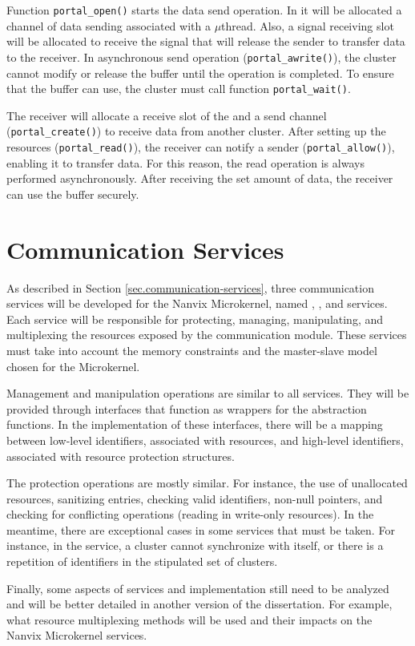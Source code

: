 		Function \texttt{portal\_open()} starts the data send operation.
		In it will be allocated a channel of data sending associated with
		a $\mu$thread.
		Also, a signal receiving slot will be allocated to receive the
		signal that will release the sender to transfer data to the receiver.
		In asynchronous send operation (\texttt{portal\_awrite()}), the cluster
		cannot modify or release the buffer until the operation is completed.
		To ensure that the buffer can use, the cluster must call function \texttt{portal\_wait()}.

		The receiver will allocate a receive slot of the \dnoc and a send
		channel (\texttt{portal\_create()}) to receive data from another cluster.
		After setting up the resources (\texttt{portal\_read()}), the receiver
		can notify a sender (\texttt{portal\_allow()}), enabling it to transfer data.
		For this reason, the read operation is always performed asynchronously.
		After receiving the set amount of data, the receiver can use the buffer securely.

	\section{Communication Services}

		As described in Section \ref{sec.communication-services}, three communication
		services will be developed for the Nanvix Microkernel, named \sync, \mailbox,
		and \portal services.
		Each service will be responsible for protecting, managing, manipulating,
		and multiplexing the resources exposed by the \hal communication module.
		These services must take into account the memory constraints and the
		master-slave model chosen for the Microkernel.

		Management and manipulation operations are similar to all services.
		They will be provided through interfaces that function as wrappers
		for the \hal abstraction functions.
		In the implementation of these interfaces, there will be a mapping
		between low-level identifiers, associated with \hal resources,
		and high-level identifiers, associated with resource protection structures.

		The protection operations are mostly similar.
		For instance, the use of unallocated resources, sanitizing entries,
		checking valid identifiers, non-null pointers, and checking
		for conflicting operations (reading in write-only resources).
		In the meantime, there are exceptional cases in some services
		that must be taken.
		For instance, in the \sync service, a cluster cannot synchronize
		with itself, or there is a repetition of identifiers in the
		stipulated set of clusters.

		Finally, some aspects of services and implementation still need
		to be analyzed and will be better detailed in another version
		of the dissertation.
		For example, what resource multiplexing methods will be used
		and their impacts on the Nanvix Microkernel services.
